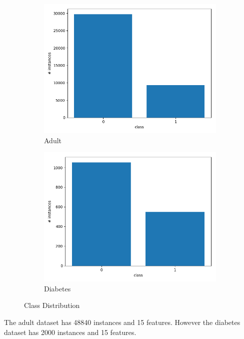\documentclass[11pt, twocolumn]{article}
\begin{document}
    \begin{figure}[!htbp]
        \begin{subfigure}{.24\textwidth}
            \centering
            \includegraphics[width=.9\textwidth]{distribution_Adult}
            \caption{Adult}
            \label{fig:balance_curve_adult}
        \end{subfigure}
        \begin{subfigure}{.24\textwidth}
            \centering
            \includegraphics[width=.9\textwidth]{distribution_Diabetes}
            \caption{Diabetes}
            \label{fig:balance_diabetes}
        \end{subfigure}
        \caption{Class Distribution}
    \end{figure}
    \FloatBarrier

    The adult dataset has 48840 instances and 15 features.
    However the diabetes dataset has 2000 instances and 15 features.
\end{document}
